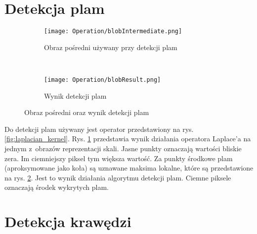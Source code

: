 \section{Detekcja plam}
\label{sec:dzialanieBlob}

\begin{figure}[h]
\begin{center}

\begin{subfigure}[t]{0.3\textwidth}
\texttt{[image: Operation/blobIntermediate.png]}
\caption{Obraz pośredni używany przy detekcji plam}
\label{fig:blobIntermediate}
\end{subfigure}
~
\begin{subfigure}[t]{0.3\textwidth}
\texttt{[image: Operation/blobResult.png]}
\caption{Wynik detekcji plam}
\label{fig:blobResult}
\end{subfigure}

\end{center}
\label{fig:showBlob}
\caption{Obraz pośredni oraz wynik detekcji plam}
\end{figure}

Do detekcji plam używany jest operator przedstawiony na rys. \ref{fig:laplacian_kernel}. Rys. \ref{fig:blobIntermediate} przedstawia wynik działania operatora Laplace'a na jednym z~obrazów reprezentacji skali. Jasne punkty oznaczają wartości bliskie zera. Im ciemniejszy piksel tym większa wartość. Za punkty środkowe plam (aproksymowane jako koła) są uznawane maksima lokalne, które są przedstawione na rys. \ref{fig:blobResult}. Jest to wynik działania algorytmu detekcji plam. Ciemne piksele oznaczają środek wykrytych plam.

\section{Detekcja krawędzi}
\label{sec:dzialanieEdge}

